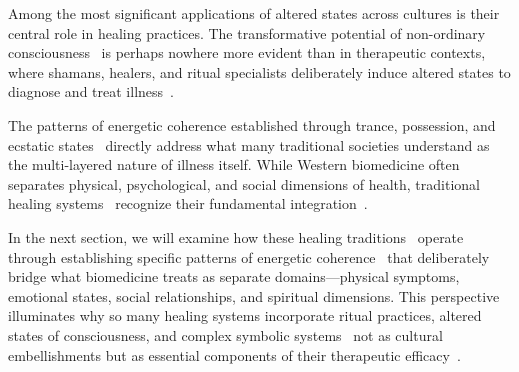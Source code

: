 Among the most significant applications of altered states across cultures is their central role in healing practices. The transformative potential of non-ordinary consciousness~ is perhaps nowhere more evident than in therapeutic contexts, where shamans, healers, and ritual specialists deliberately induce altered states to diagnose and treat illness~\cite{csordas1994sacred,kapferer1991celebration}.

The patterns of energetic coherence established through trance, possession, and ecstatic states~ directly address what many traditional societies understand as the multi-layered nature of illness itself. While Western biomedicine often separates physical, psychological, and social dimensions of health, traditional healing systems~ recognize their fundamental integration~\cite{kleinman1980patients,good1994medicine}.

In the next section, we will examine how these healing traditions~ operate through establishing specific patterns of energetic coherence~ that deliberately bridge what biomedicine treats as separate domains—physical symptoms, emotional states, social relationships, and spiritual dimensions. This perspective illuminates why so many healing systems incorporate ritual practices, altered states of consciousness, and complex symbolic systems~ not as cultural embellishments but as essential components of their therapeutic efficacy~\cite{csordas2002body,desjarlais1992body}.
